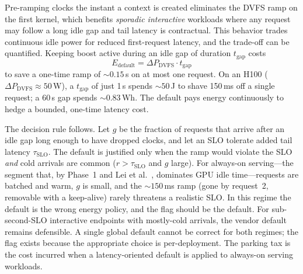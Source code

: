 \documentclass[conference]{IEEEtran}
\begin{document}
Pre-ramping clocks the instant a context is created eliminates the DVFS ramp on the first kernel, which benefits \emph{sporadic interactive} workloads where any request may follow a long idle gap and tail latency is contractual. This behavior trades continuous idle power for reduced first-request latency, and the trade-off can be quantified. Keeping boost active during an idle gap of duration $t_{\text{gap}}$ costs
\begin{equation}
E_{\text{default}} = \Delta P_{\text{DVFS}} \cdot t_{\text{gap}}
\label{eq:default-cost}
\end{equation}
to save a one-time ramp of ${\sim}0.15$\,s on at most one request. On an H100 ($\Delta P_{\text{DVFS}} \approx 50$\,W), a $t_{\text{gap}}$ of just 1\,s spends ${\sim}50$\,J to shave 150\,ms off a single request; a 60\,s gap spends ${\sim}0.83$\,Wh. The default pays energy continuously to hedge a bounded, one-time latency cost.

The decision rule follows. Let $g$ be the fraction of requests that arrive after an idle gap long enough to have dropped clocks, and let an SLO tolerate added tail latency $\tau_{\text{SLO}}$. The default is justified only when the ramp would violate the SLO \emph{and} cold arrivals are common ($r > \tau_{\text{SLO}}$ and $g$ large). For always-on serving---the segment that, by Phase~1 and Lei et al.~\cite{lei-idle}, dominates GPU idle time---requests are batched and warm, $g$ is small, and the ${\sim}150$\,ms ramp (gone by request~2, removable with a keep-alive) rarely threatens a realistic SLO. In this regime the default is the wrong energy policy, and the flag should be the default. For sub-second-SLO interactive endpoints with mostly-cold arrivals, the vendor default remains defensible. A single global default cannot be correct for both regimes; the flag exists because the appropriate choice is per-deployment. The parking tax is the cost incurred when a latency-oriented default is applied to always-on serving workloads.

\end{document}
